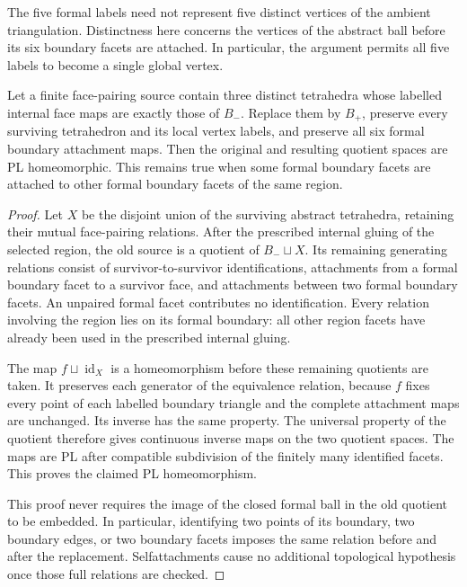 The five formal labels need not represent five distinct vertices of the
ambient triangulation.  Distinctness here concerns the vertices of the
abstract ball before its six boundary facets are attached.  In particular,
the argument permits all five labels to become a single global vertex.

\begin{proposition}
\label{prop:strict-pachner32-relative}
Let a finite face-pairing source contain three distinct tetrahedra whose
labelled internal face maps are exactly those of $B_-$.  Replace them by
$B_+$, preserve every surviving tetrahedron and its local vertex labels,
and preserve all six formal boundary attachment maps.  Then the original
and resulting quotient spaces are PL homeomorphic.  This remains true
when some formal boundary facets are attached to other formal boundary
facets of the same region.
\end{proposition}
\begin{proof}
Let $X$ be the disjoint union of the surviving abstract tetrahedra,
retaining their mutual face-pairing relations.  After the prescribed
internal gluing of the selected region, the old source is a quotient of
$B_-\sqcup X$.  Its remaining generating relations consist of
survivor-to-survivor identifications, attachments from a formal boundary
facet to a survivor face, and attachments between two formal boundary
facets.  An unpaired formal facet contributes no identification.  Every
relation involving the region lies on its formal boundary: all other
region facets have already been used in the prescribed internal gluing.

The map $f\sqcup\operatorname{id}_X$ is a homeomorphism before these
remaining quotients are taken.  It preserves each generator of the
equivalence relation, because $f$ fixes every point of each labelled
boundary triangle and the complete attachment maps are unchanged.
Its inverse has the same property.  The universal property of the quotient
therefore gives continuous inverse maps on the two quotient spaces.
The maps are PL after compatible subdivision of the finitely many
identified facets.  This proves the claimed PL homeomorphism.

This proof never requires the image of the closed formal ball in the old
quotient to be embedded.  In particular, identifying two points of its
boundary, two boundary edges, or two boundary facets imposes the same
relation before and after the replacement.  Selfattachments cause no
additional topological hypothesis once those full relations are checked.
\end{proof}

